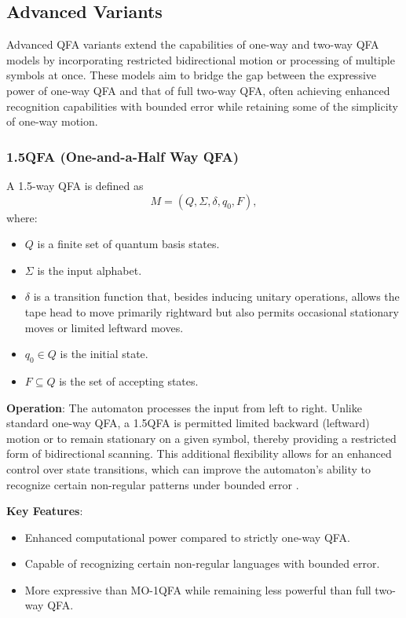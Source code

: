 \subsection{Advanced Variants}
\label{subsec:advanced-variants}

Advanced QFA variants extend the capabilities of one-way and two-way QFA models by incorporating restricted bidirectional motion or processing of multiple symbols at once. These models aim to bridge the gap between the expressive power of one-way QFA and that of full two-way QFA, often achieving enhanced recognition capabilities with bounded error while retaining some of the simplicity of one-way motion.

\subsubsection{1.5QFA (One-and-a-Half Way QFA)}
\label{sssec:1.5qfa}
\begin{definition}[1.5QFA]
A 1.5-way QFA is defined as 
\[
M = (Q, \Sigma, \delta, q_0, F),
\]
where:
\begin{itemize}
    \item \( Q \) is a finite set of quantum basis states.
    \item \( \Sigma \) is the input alphabet.
    \item \( \delta \) is a transition function that, besides inducing unitary operations, allows the tape head to move primarily rightward but also permits occasional stationary moves or limited leftward moves.
    \item \( q_0 \in Q \) is the initial state.
    \item \( F \subseteq Q \) is the set of accepting states.
\end{itemize}
\end{definition}

\textbf{Operation}:  
The automaton processes the input from left to right. Unlike standard one-way QFA, a 1.5QFA is permitted limited backward (leftward) motion or to remain stationary on a given symbol, thereby providing a restricted form of bidirectional scanning. This additional flexibility allows for an enhanced control over state transitions, which can improve the automaton's ability to recognize certain non-regular patterns under bounded error \cite{kondacs1997power}.

\textbf{Key Features}:
\begin{itemize}
    \item Enhanced computational power compared to strictly one-way QFA.
    \item Capable of recognizing certain non-regular languages with bounded error.
    \item More expressive than MO-1QFA while remaining less powerful than full two-way QFA.
\end{itemize}

